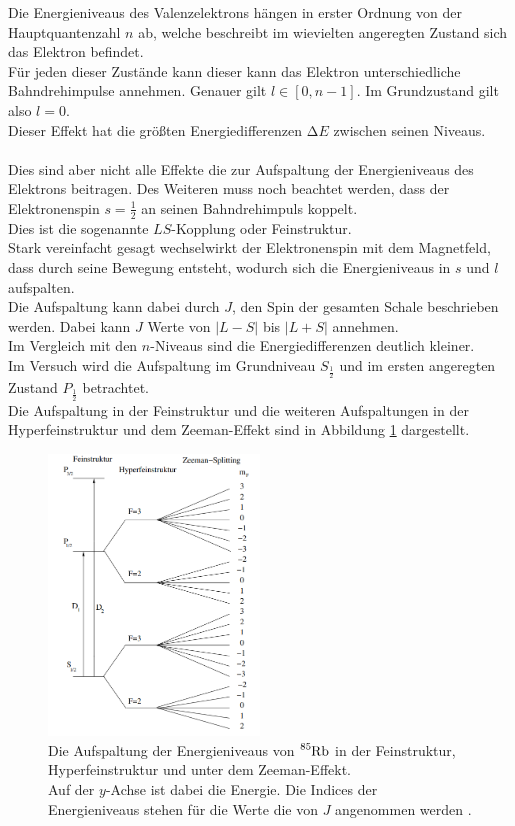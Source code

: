 \noindent
Die Energieniveaus des Valenzelektrons hängen in erster Ordnung von der Hauptquantenzahl $n$ ab, welche beschreibt im wievielten angeregten Zustand sich das Elektron befindet.\\
Für jeden dieser Zustände kann dieser kann das Elektron unterschiedliche Bahndrehimpulse annehmen. Genauer gilt $l \in [0, n-1]$. Im Grundzustand gilt also $l = 0$.\\
Dieser Effekt hat die größten Energiedifferenzen $\increment E$ zwischen seinen Niveaus.\\\\
Dies sind aber nicht alle Effekte die zur Aufspaltung der Energieniveaus des Elektrons beitragen.
Des Weiteren muss noch beachtet werden, dass der Elektronenspin $s =\frac{1}{2}$ an seinen Bahndrehimpuls koppelt.\\
Dies ist die sogenannte $LS$-Kopplung oder Feinstruktur. \\
Stark vereinfacht gesagt wechselwirkt der Elektronenspin mit dem Magnetfeld, dass durch seine Bewegung entsteht, wodurch sich die Energieniveaus in $s$ und $l$ aufspalten.\\
Die Aufspaltung kann dabei durch $J$, den Spin der gesamten Schale beschrieben werden. Dabei kann $J$ Werte von $\bigl| L - S \bigr|$ bis $\bigl| L + S \bigr|$ annehmen.\\
Im Vergleich mit den $n$-Niveaus sind die Energiedifferenzen deutlich kleiner.\\
Im Versuch wird die Aufspaltung im Grundniveau $S_{\frac{1}{2}}$ und im ersten angeregten Zustand $P_\frac{1}{2}$ betrachtet.\\
Die Aufspaltung in der Feinstruktur und die weiteren Aufspaltungen in der Hyperfeinstruktur und dem Zeeman-Effekt sind in Abbildung \ref{img:aufspaltung} dargestellt.
\begin{figure}[H]
    \centering
    \includegraphics[width=0.5\textwidth]{latex/images/energy_levels_85.PNG}
    \caption{Die Aufspaltung der Energieniveaus von $\ce{^{85}Rb}$ in der Feinstruktur, Hyperfeinstruktur und unter dem Zeeman-Effekt.\\
    Auf der $y$-Achse ist dabei die Energie.
    Die Indices der Energieniveaus stehen für die Werte die von $J$ angenommen werden \protect \cite{pump_2}.}
    \label{img:aufspaltung}
\end{figure}


